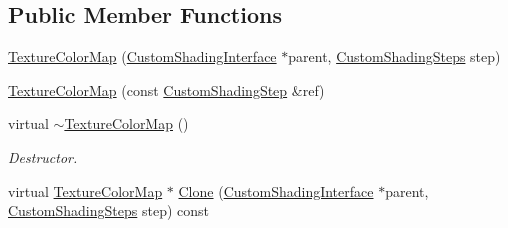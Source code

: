 \subsection*{Public Member Functions}
\begin{DoxyCompactItemize}
\item 
\mbox{\hyperlink{class_geometry_engine_1_1_custom_shading_1_1_texture_color_map_a000a319c9a3f470c14ecaa533ae6b27c}{Texture\+Color\+Map}} (\mbox{\hyperlink{class_geometry_engine_1_1_custom_shading_1_1_custom_shading_interface}{Custom\+Shading\+Interface}} $\ast$parent, \mbox{\hyperlink{namespace_geometry_engine_1_1_custom_shading_a2dc236a5b567da5099069ce2b2be5609}{Custom\+Shading\+Steps}} step)
\item 
\mbox{\hyperlink{class_geometry_engine_1_1_custom_shading_1_1_texture_color_map_a78b2a1cecd9e82a5b3e80a29509685de}{Texture\+Color\+Map}} (const \mbox{\hyperlink{class_geometry_engine_1_1_custom_shading_1_1_custom_shading_step}{Custom\+Shading\+Step}} \&ref)
\item 
\mbox{\label{class_geometry_engine_1_1_custom_shading_1_1_texture_color_map_ab9608857ab1643d06f219b8d4a6ef112}} 
virtual \mbox{\hyperlink{class_geometry_engine_1_1_custom_shading_1_1_texture_color_map_ab9608857ab1643d06f219b8d4a6ef112}{$\sim$\+Texture\+Color\+Map}} ()
\begin{DoxyCompactList}\small\item\em Destructor. \end{DoxyCompactList}\item 
virtual \mbox{\hyperlink{class_geometry_engine_1_1_custom_shading_1_1_texture_color_map}{Texture\+Color\+Map}} $\ast$ \mbox{\hyperlink{class_geometry_engine_1_1_custom_shading_1_1_texture_color_map_a6ad5122de9e2e82000a69b9a777845b1}{Clone}} (\mbox{\hyperlink{class_geometry_engine_1_1_custom_shading_1_1_custom_shading_interface}{Custom\+Shading\+Interface}} $\ast$parent, \mbox{\hyperlink{namespace_geometry_engine_1_1_custom_shading_a2dc236a5b567da5099069ce2b2be5609}{Custom\+Shading\+Steps}} step) const
\end{DoxyCompactItemize}
